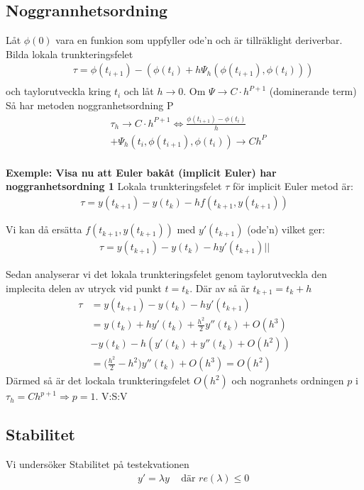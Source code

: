 \begin{multicols}{2}
\subsection{Noggrannhetsordning}
Låt $\phi(0)$ vara en funkion som uppfyller ode'n och är tillräklight deriverbar.
Bilda lokala trunkteringsfelet
\begin{align*}
  &\quad \tau = \phi(t_{i+1})-(\phi(t_i)+h\Psi_h(\phi(t_{i+1}),\phi(t_i))) \\
\end{align*}
och taylorutveckla kring $t_i$ och låt $h\to0$. 
Om $\Psi\to{C\cdot{h^{P+1}}}$ (dominerande term)
Så har metoden noggranhetsordning P
\begin{align*}
  &\tau_h\to{C\cdot{h^{P+1}}} \Leftrightarrow \frac{\phi(t_{i+1})-\phi(t_i)}{h} \\
  &+\Psi_h(t_i,\phi(t_{i+1}),\phi(t_i))\to{Ch^P} \\
\end{align*}


\textbf{Exemple: Visa nu att Euler bakåt (implicit Euler) har noggranhetsordning 1} \newline
Lokala trunkteringsfelet $\tau$ för implicit Euler metod är:
\begin{align*}
  \tau = y(t_{k+1})-y(t_k)-hf(t_{k+1},y(t_{k+1}))
\end{align*}

Vi kan då ersätta $f(t_{k+1},y(t_{k+1}))$ med $y'(t_{k+1})$ (ode'n) vilket ger:
\begin{align*}
  \tau = y(t_{k+1})-y(t_k)-hy'(t_{k+1})||
\end{align*}

Sedan analyserar vi det lokala trunkteringsfelet genom taylorutveckla
den implecita delen av utryck vid punkt $t=t_k$.
Där av så är $t_{k+1}=t_k+h$
\begin{align*}
  \tau &= y(t_{k+1})-y(t_k)-hy'(t_{k+1})  \\
  &= y(t_k)+hy'(t_k)+\frac{h^2}{2}y''(t_k)+O(h^3) \\
  &-y(t_k)-h(y'(t_k)+y''(t_k)+O(h^2)) \\
  &= \big( \frac{h^2}{2} - h^2 \big)y''(t_k)+O(h^3) = O(h^2)
\end{align*}
Därmed så är det lockala trunkteringsfelet $O(h^2)$ och nogranhets ordningen
$p$ i $\tau_{h}=Ch^{p+1}\Rightarrow p=1$. V:S:V 


\subsection{Stabilitet}
Vi undersöker Stabilitet på testekvationen
\begin{align*}
  &\quad  y'=\lambda y \;\;\; \text{ där } re(\lambda)\leq 0 \\
\end{align*}


\end{multicols}
